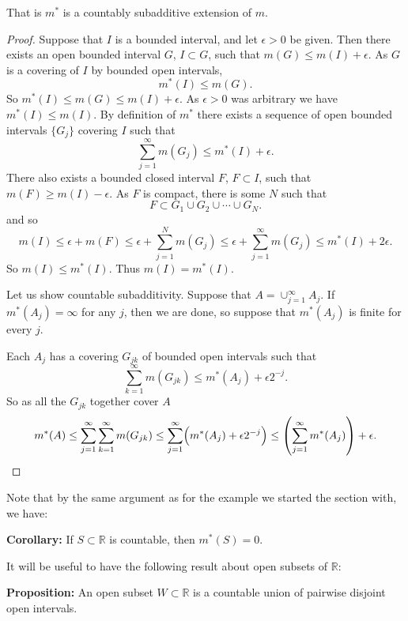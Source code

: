 \documentclass[12pt]{book}
\newcommand{\R}{{\mathbb{R}}}
\theoremstyle{plain}
\theoremstyle{remark}
\theoremstyle{definition}
\theoremstyle{exercise}
\theoremstyle{example}
\begin{document}
That is $m^*$ is a countably subadditive extension of $m$.

\medskip

\begin{proof}
Suppose that $I$ is a bounded interval, and let $\epsilon > 0$ be given.
Then there exists an open bounded interval $G$, $I \subset G$, such that
$m(G) \leq m(I) + \epsilon$.
As $G$ is a covering of $I$ by bounded open intervals,
$$
m^*(I) \leq m(G) .
$$
So $m^*(I) \leq m(G) \leq m(I) + \epsilon$.  As $\epsilon > 0$
was arbitrary we have $m^*(I) \leq m(I)$.
By definition of $m^*$ there exists a sequence
of open bounded intervals $\{ G_j \}$ covering $I$ such that
$$
\sum_{j=1}^\infty m(G_j) \leq m^*(I) + \epsilon .
$$
There also exists a bounded closed interval $F$, $F \subset I$, such that
$m(F) \geq m(I)-\epsilon$.
As $F$ is compact, there is some $N$ such that
$$
F \subset G_1 \cup G_2 \cup \cdots \cup G_N .
$$
and so
$$
m(I) \leq \epsilon+m(F) \leq \epsilon + \sum_{j=1}^N m(G_j)
\leq 
\epsilon + \sum_{j=1}^\infty m(G_j) \leq m^*(I) + 2\epsilon .
$$
So $m(I) \leq m^*(I)$.  Thus $m(I) = m^*(I)$.

\medskip

Let us show countable subadditivity.
Suppose that $A = \cup_{j=1}^\infty A_j$.
If $m^*(A_j) = \infty$ for any $j$, then we are done, so suppose that
$m^*(A_j)$ is finite for every $j$.

Each $A_j$
has a covering $G_{jk}$ of bounded open intervals such that
$$
\sum_{k=1}^\infty m(G_{jk}) \leq m^*(A_j) + \epsilon 2^{-j} .
$$
So as all the $G_{jk}$ together cover $A$
$$
m^*(A)
\leq
\sum_{j=1}^\infty
\sum_{k=1}^\infty
m(G_{jk})
\leq
\sum_{j=1}^\infty
\Bigl( m^*(A_j) + \epsilon 2^{-j} \Bigr)
\leq
\left(
\sum_{j=1}^\infty
m^*(A_j) \right)
+ \epsilon .
$$
\end{proof}

Note that by the same argument as for the example we started the section
with, we have:

\medskip

\textbf{Corollary:}
If $S \subset \R$ is countable, then $m^*(S) = 0$.

\medskip

It will be useful to have the following result about open subsets of $\R$:

\medskip

\textbf{Proposition:}
An open subset $W \subset \R$ is a countable union of pairwise
disjoint open intervals.

\medskip
\end{document}
